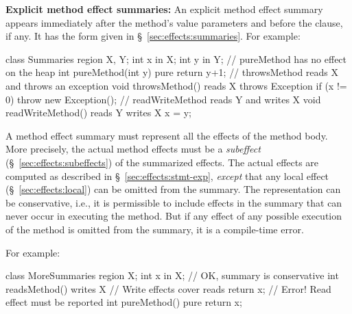 \noindent
\textbf{Explicit method effect summaries:} An explicit method effect
summary appears immediately after the method's value parameters and
before the  clause, if any.  It has the form given in
\S~\ref{sec:effects:summaries}.  For example:
%
\begin{dpjlisting}
class Summaries {
  region X, Y;
  int x in X;
  int y in Y;
  // pureMethod has no effect on the heap
  int pureMethod(int y) pure { return y+1; }
  // throwsMethod reads X and throws an exception
  void throwsMethod() reads X throws Exception {
    if (x != 0) throw new Exception();
  }
  // readWriteMethod reads Y and writes X
  void readWriteMethod() reads Y writes X {
    x = y;
  }
}
\end{dpjlisting}
%

A method effect summary must represent all the effects of the method
body.  More precisely, the actual method effects must be a
\emph{subeffect} (\S~\ref{sec:effects:subeffects}) of the summarized
effects.  The actual effects are computed as described in
\S~\ref{sec:effects:stmt-exp}, \emph{except} that any local effect
(\S~\ref{sec:effects:local}) can be omitted from the summary.  The
representation can be conservative, i.e., it is permissible to include
effects in the summary that can never occur in executing the method.
But if any effect of any possible execution of the method is omitted
from the summary, it is a compile-time error.  

For example:
%
\begin{dpjlisting}
class MoreSummaries {
  region X;
  int x in X;
  // OK, summary is conservative
  int readsMethod() writes X {
    // Write effects cover reads
    return x;
  }
  // Error!  Read effect must be reported
  int pureMethod() pure {
    return x;
  }
}
\end{dpjlisting}
%

